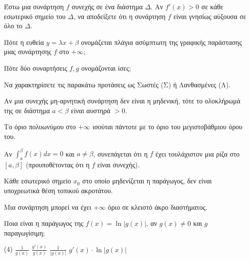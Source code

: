 \documentclass[11pt,a4paper]{article}
\newcommand{\kerkissans}[1]{{\fontfamily{maksf}\selectfont \textbf{#1}}}
\renewcommand{\textdexiakeraia}{}
\newcommand{\dint}{\displaystyle\int}
\newcommand\themanum{A}
\newcounter{thema}[section]
\renewcommand{\thethema}{\arabic{thema}}
\newcommand{\Thema}{\refstepcounter{thema}{\textbf{\textcolor{black}{\faPenSquare\ \  \large \kerkissans{\textbf{\thethemaο\hspace{2mm}Διαγώνισμα - Θέμα \themanum}}}}}\hspace{0mm}}{}
\newenvironment{thema}[1]
{\begin{tcolorbox}[title=\Thema\kerkissans{\textbf{\large{  #1}}},breakable,
enhanced standard,titlerule=0pt,toprule=0pt, rightrule=0pt, bottomrule=0pt,
colback=white,left=0mm,top=1mm,bottom=0mm,
boxrule=0pt,
colframe=white,leftrule=0mm,sharp corners,coltitle=black]
\renewcommand{\themanum}{#1}}
{\end{tcolorbox}}
\begin{document}
\begin{thema}{A}
\begin{erwthma}
    \item Έστω μια συνάρτηση $f$ συνεχής σε ένα διάστημα $\Delta$. Αν $f'(x)>0$ σε κάθε εσωτερικό σημείο του $\Delta$, να αποδείξετε ότι η συνάρτηση $f$ είναι γνησίως αύξουσα σε όλο το $\Delta$.
    \item Πότε η ευθεία $y=\lambda x+\beta$ ονομάζεται πλάγια ασύμπτωτη της γραφικής παράστασης μιας συνάρτησης $f$ στο $+\infty$;
    \item Πότε δύο συναρτήσεις $f, g$ ονομάζονται ίσες;
    \item Να χαρακτηρίσετε τις παρακάτω προτάσεις ως Σωστές (Σ) ή Λανθασμένες (Λ).
    \begin{alist}
        \item Αν μια συνεχής μη-αρνητική συνάρτηση δεν είναι η μηδενική, τότε το ολοκλήρωμά της σε διάστημα $a<\beta$ είναι αυστηρά $> 0$.
        \item Το όριο πολυωνύμου στο $+\infty$ ισούται πάντοτε με το όριο του μεγιστοβάθμιου όρου του.
        \item Αν $\dint_a^\beta f(x) dx = 0$ και $a \ne \beta$, συνεπάγεται ότι η $f$ έχει τουλάχιστον μια ρίζα στο $[a, \beta]$ (προυποθέτοντας ότι η $f$ είναι συνεχής).
        \item Κάθε εσωτερικό σημείο $x_0$ στο οποίο μηδενίζεται η παράγωγος, δεν είναι υποχρεωτικά θέση τοπικού ακροτάτου.
        \item Μια συνάρτηση μπορεί να έχει $+\infty$ όριο σε κλειστό άκρο διαστήματος.
    \end{alist}
    \item Ποια είναι η παράγωγος της $f(x) = \ln|g(x)|$, αν $g(x) \ne 0$ και $g$ παραγωγίσιμη;
    \begin{tasks}[label=\let\textdexiakeraia\relax\alph*.](4)
        \task $\frac{1}{g(x)}$
        \task $\frac{g'(x)}{g(x)}$
        \task $\frac{1}{|g(x)|}$
        \task $g'(x) \cdot \ln|g(x)|$
    \end{tasks}
\end{erwthma}
\end{thema}
\vspace{1cm}
\end{document}
